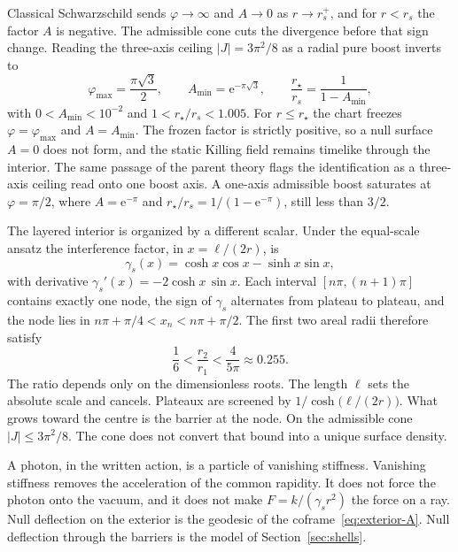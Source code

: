 \documentclass[a4paper]{article}
\begin{document}
Classical Schwarzschild sends \(\varphi\to\infty\) and \(A\to 0\) as \(r\to r_s^+\), and for \(r<r_s\) the factor \(A\) is negative. The admissible cone cuts the divergence before that sign change. Reading the three-axis ceiling \(|J|=3\pi^2/8\) as a radial pure boost inverts to
\begin{equation}
\label{eq:quasihorizon}
\varphi_{\max}=\frac{\pi\sqrt{3}}{2},
\qquad
A_{\min}=\mathrm{e}^{-\pi\sqrt{3}},
\qquad
\frac{r_\star}{r_s}=\frac{1}{1-A_{\min}},
\end{equation}
with \(0<A_{\min}<10^{-2}\) and \(1<r_\star/r_s<1.005\). For \(r\le r_\star\) the chart freezes \(\varphi=\varphi_{\max}\) and \(A=A_{\min}\). The frozen factor is strictly positive, so a null surface \(A=0\) does not form, and the static Killing field remains timelike through the interior. The same passage of the parent theory flags the identification as a three-axis ceiling read onto one boost axis. A one-axis admissible boost saturates at \(\varphi=\pi/2\), where \(A=\mathrm{e}^{-\pi}\) and \(r_\star/r_s=1/(1-\mathrm{e}^{-\pi})\), still less than \(3/2\).

The layered interior is organized by a different scalar. Under the equal-scale ansatz the interference factor, in \(x=\ell/(2r)\), is
\begin{equation}
\label{eq:gamma-s}
\gamma_s(x)=\cosh x\cos x-\sinh x\sin x,
\end{equation}
with derivative \(\gamma_s'(x)=-2\cosh x\,\sin x\). Each interval \([n\pi,(n+1)\pi]\) contains exactly one node, the sign of \(\gamma_s\) alternates from plateau to plateau, and the node lies in \(n\pi+\pi/4<x_n<n\pi+\pi/2\). The first two areal radii therefore satisfy
\begin{equation}
\label{eq:radius-ratio}
\frac16<\frac{r_2}{r_1}<\frac{4}{5\pi}\approx 0.255.
\end{equation}
The ratio depends only on the dimensionless roots. The length \(\ell\) sets the absolute scale and cancels. Plateaux are screened by \(1/\cosh\bigl(\ell/(2r)\bigr)\). What grows toward the centre is the barrier at the node. On the admissible cone \(|J|\le 3\pi^2/8\). The cone does not convert that bound into a unique surface density.

A photon, in the written action, is a particle of vanishing stiffness. Vanishing stiffness removes the acceleration of the common rapidity. It does not force the photon onto the vacuum, and it does not make \(F=k/(\gamma_s r^2)\) the force on a ray. Null deflection on the exterior is the geodesic of the coframe~\eqref{eq:exterior-A}. Null deflection through the barriers is the model of Section~\ref{sec:shells}.
\end{document}
